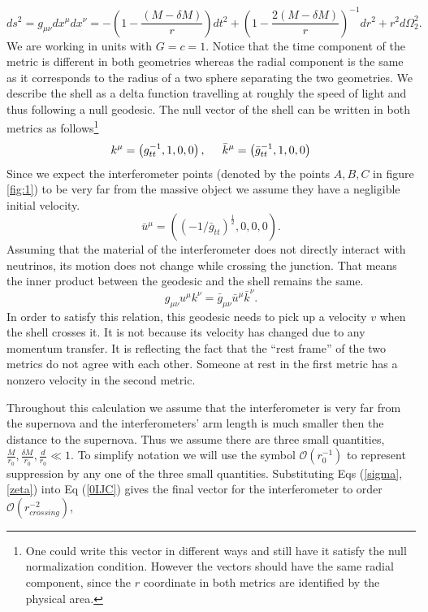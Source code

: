 \documentclass[aps,showpacs,onecolumn,floats,prd,superscriptaddress,nofootinbib]{revtex4-1}
\begin{document}
\begin{equation}
	ds^2 = g_{\mu \nu} dx^\mu dx^\nu = - \left( 1 - \frac{(M - \delta M)}{r} \right) dt^2 + \left( 1 - \frac{2(M - \delta M)}{r} \right)^{-1} dr^2 + r^2 d \Omega_2^2. \label{SCHa}
\end{equation}
We are working in units with $G = c =1$.  Notice that the time component of the metric is different in both geometries whereas the radial component is the same as it corresponds to the radius of a two sphere separating the two geometries.  We describe the shell as a delta function travelling at roughly the speed of light and thus following a null geodesic. The null vector of the shell can be written in both metrics as follows\footnote{One could write this vector in different ways and still have it satisfy the null normalization condition. However the vectors should have the same radial component, since the $r$ coordinate in both metrics are identified by the physical area.}
\begin{equation}
	k^\mu = \left( g_{tt}^{-1}, 1, 0, 0 \right), \hspace{5mm} \bar{k}^\mu = \left( \bar{g}_{tt}^{-1}, 1, 0, 0 \right)	\label{sigma}
\end{equation}
Since we expect the interferometer points (denoted by the points $A,B,C$ in figure \ref{fig:1}) to be very far from the massive object we assume they have a negligible initial velocity.
\begin{equation}
	\bar{u}^\mu = \left( (-1/\bar{g}_{tt})^\frac{1}{2}, 0, 0, 0 \right).	\label{zeta}
\end{equation}
Assuming that the material of the interferometer does not directly interact with neutrinos, its motion does not change while crossing the junction. 
That means the inner product between the geodesic and the shell remains the same.\begin{equation}
	 g_{\mu \nu} u^\mu k^\nu = \bar{g}_{\mu \nu} \bar{u}^\mu \bar{k}^\nu. 	\label{0IJC}
\end{equation}
In order to satisfy this relation, this geodesic needs to pick up a velocity $v$ when the shell crosses it.
It is not because its velocity has changed due to any momentum transfer.
It is reflecting the fact that the ``rest frame'' of the two metrics do not agree with each other.
Someone at rest in the first metric has a nonzero velocity in the second metric.

Throughout this calculation we assume that the interferometer is very far from the supernova and the interferometers' arm length is much smaller then the distance to the supernova. Thus we assume there are three small quantities, $\frac{M}{r_0}, \frac{\delta M}{r_0}, \frac{d}{r_0}\ll1$. To simplify notation we will use the symbol $\mathcal{O}(r^{-1}_{0})$ to represent suppression by any one of the three small quantities. 
Substituting Eqs (\ref{sigma}, \ref{zeta}) into Eq (\ref{0IJC}) gives the final vector for the interferometer to order $\mathcal{O}(r_{crossing}^{-2})$,
\end{document}
